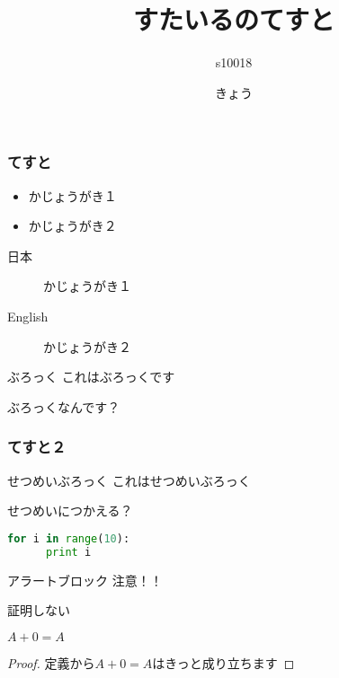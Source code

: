 \documentclass[17pt,aspectratio=1610,cjk, xelatex]{beamer}
\title{すたいるのてすと}
\author{s10018}
\date{きょう}
\begin{document}
\maketitle{}

\begin{frame}
  \frametitle{てすと}
  
  \begin{itemize}
      \item かじょうがき１
      \item かじょうがき２
  \end{itemize}

  \begin{description}
      \item[日本] かじょうがき１
      \item[English] かじょうがき２
  \end{description}
  
  \begin{block}{ぶろっく}
    これはぶろっくです

    ぶろっくなんです？
  \end{block}
\end{frame}

\begin{frame}[fragile]
  \frametitle{てすと２}

  \begin{exampleblock}{せつめいぶろっく}
    これはせつめいぶろっく

    せつめいにつかえる？

\begin{lstlisting}[language=Python, basicstyle=\small\ttfamily]
  for i in range(10):
      print i
\end{lstlisting}
  \end{exampleblock}

  \begin{alertblock}{アラートブロック}
    注意！！
  \end{alertblock}

\end{frame}


\begin{frame}{証明しない}
\begin{theorem}
  $A + 0 = A$
\end{theorem}
\begin{proof}
  定義から$A + 0 = A$はきっと成り立ちます
\end{proof}
\end{frame}
\end{document}
